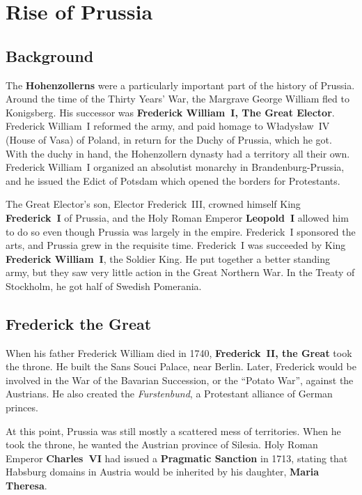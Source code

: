 \section{Rise of Prussia}

\subsection*{Background}

The \textbf{Hohenzollerns} were a particularly important part of the history of Prussia.
Around the time of the Thirty Years' War, the Margrave George William fled to Konigsberg.
His successor was \textbf{Frederick William~I, The Great Elector}.
Frederick William~I reformed the army, and paid homage to W\l{}adys\l{}aw~IV (House of Vasa) of Poland,
in return for the Duchy of Prussia, which he got.
With the duchy in hand, the Hohenzollern dynasty had a territory all their own.
Frederick William~I organized an absolutist monarchy in Brandenburg-Prussia,
and he issued the Edict of Potsdam which opened the borders for Protestants.

The Great Elector's son, Elector Frederick~III, crowned himself King \textbf{Frederick~I} of Prussia,
and the Holy Roman Emperor \textbf{Leopold~I} allowed him to do so even though Prussia was largely in the empire.
Frederick~I sponsored the arts, and Prussia grew in the requisite time.
Frederick~I was succeeded by King \textbf{Frederick William~I}, the Soldier King.
He put together a better standing army, but they saw very little action in the Great Northern War.
In the Treaty of Stockholm, he got half of Swedish Pomerania.

\subsection*{Frederick the Great}

When his father Frederick William died in 1740, \textbf{Frederick~II, the Great} took the throne.
He built the Sans Souci Palace, near Berlin.
Later, Frederick would be involved in the War of the Bavarian Succession, or the ``Potato War'',
against the Austrians.
He also created the \textit{Furstenbund}, a Protestant alliance of German princes.

At this point, Prussia was still mostly a scattered mess of territories.
When he took the throne, he wanted the Austrian province of Silesia.
Holy Roman Emperor \textbf{Charles~VI} had issued a \textbf{Pragmatic Sanction} in 1713,
stating that Habsburg domains in Austria would be inherited by his daughter, \textbf{Maria Theresa}.

